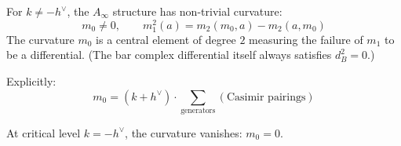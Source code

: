 \begin{theorem}\label{thm:w-bar-curvature}
For $k \neq -h^\vee$, the $A_\infty$ structure has non-trivial curvature:
\begin{equation}
m_0 \neq 0, \qquad m_1^2(a) = m_2(m_0, a) - m_2(a, m_0)
\end{equation}
The curvature $m_0$ is a central element of degree $2$ measuring the failure of $m_1$ to be a differential. (The bar complex differential itself always satisfies $d_B^2 = 0$.)

Explicitly:
\begin{equation}
m_0 = (k + h^\vee) \cdot \sum_{\text{generators}} (\text{Casimir pairings})
\end{equation}

At critical level $k = -h^\vee$, the curvature vanishes: $m_0 = 0$.
\end{theorem}

